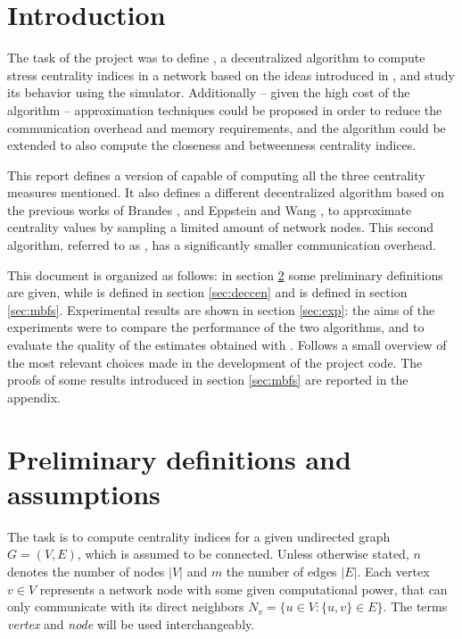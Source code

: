 
\theoremstyle{definition}
\newtheorem*{defcc}{Closeness centrality}
\newtheorem*{defsc}{Stress centrality}
\newtheorem*{defbc}{Betweenness centrality}

\section{Introduction}

The task of the project was to define \deccen{}, a decentralized algorithm to compute stress centrality indices in a network based on the ideas introduced in \cite{lehmann2003}, and study its behavior using the \peersim{} \cite{peersim} simulator. Additionally -- given the high cost of the algorithm -- approximation techniques could be proposed in order to reduce the communication overhead and memory requirements, and the algorithm could be extended to also compute the closeness and betweenness centrality indices.

This report defines a version of \deccen{} capable of computing all the three centrality measures mentioned. It also defines a different decentralized algorithm based on the previous works of Brandes \cite{brandes2001,brandes2007}, and Eppstein and Wang \cite{ew2004}, to approximate centrality values by sampling a limited amount of network nodes. This second algorithm, referred to as \multibfs{}, has a significantly smaller communication overhead.

This document is organized as follows: in section \ref{sec:def} some preliminary definitions are given, while \deccen{} is defined in section \ref{sec:deccen} and \multibfs{} is defined in section \ref{sec:mbfs}. Experimental results are shown in section \ref{sec:exp}: the aims of the experiments were to compare the performance of the two algorithms, and to evaluate the quality of the estimates obtained with \multibfs{}. Follows a small overview of the most relevant choices made in the development of the project code. The proofs of some results introduced in section \ref{sec:mbfs} are reported in the appendix.


\section{Preliminary definitions and assumptions}
\label{sec:def}

The task is to compute centrality indices for a given undirected graph $G = (V,E)$, which is assumed to be connected. Unless otherwise stated, $n$ denotes the number of nodes $|V|$ and $m$ the number of edges $|E|$. Each vertex $v \in V$ represents a network node with some given computational power, that can only communicate with its direct neighbors $N_v = \{u \in V : \{u,v\} \in E\}$. The terms \emph{vertex} and \emph{node} will be used interchangeably.

